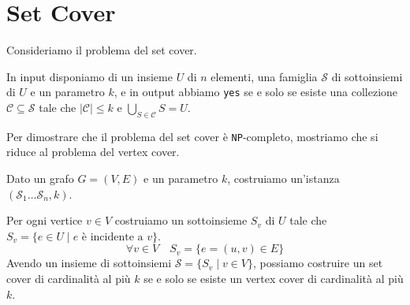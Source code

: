\section{Set Cover}
Consideriamo il problema del set cover.

In input disponiamo di un insieme $U$ di $n$ elementi, una famiglia $\mathcal{S}$ di sottoinsiemi
di $U$ e un parametro $k$, e in output abbiamo \texttt{yes} se e solo se esiste una collezione
$\mathcal{C} \subseteq \mathcal{S}$ tale che $|\mathcal{C}| \leq k$ e $\bigcup_{S \in \mathcal{C}} S = U$.

Per dimostrare che il problema del set cover è \texttt{NP}-completo, mostriamo che si riduce al
problema del vertex cover.

Dato un grafo $G = (V,E)$ e un parametro $k$, costruiamo un'istanza $(\mathcal{S}_1 
\dots \mathcal{S}_n, k)$.

Per ogni vertice $v \in V$ costruiamo un sottoinsieme $S_v$ di $U$ tale che $S_v = \{e \in U \mid e
\text{ è incidente a } v\}$.
\[
    \forall v \in V \quad S_v = \{e = (u, v) \in E\}
\]
Avendo un insieme di sottoinsiemi $\mathcal{S} = \{S_v \mid v \in V\}$, possiamo costruire
un set cover
di cardinalità al più $k$ se e solo se esiste un vertex cover di cardinalità al più $k$.

